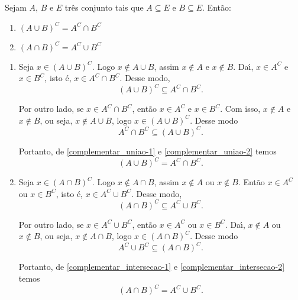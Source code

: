\begin{proposicao} Sejam $A$, $B$ e $E$ tr{\^e}s conjunto tais que $A\subseteq E$ e $B\subseteq E$. Ent{\~a}o:
\begin{enumerate}
	\item $(A\cup B)^C = A^C\cap B^C$
	\item $(A\cap B)^C = A^C\cup B^C$
\end{enumerate}
\end{proposicao}
\begin{prova}
	\begin{enumerate}
		\item Seja $x \in (A\cup B)^C$. Logo $x\notin A\cup B$, assim $x\notin A$ e $x\notin B$. Da{\'\i}, $x\in A^C$ e $x\in B^C$, isto {\'e}, $x\in A^C\cap B^C$. Desse modo,
		\begin{equation}\label{complementar_uniao-1}
			(A\cup B)^C \subseteq A^C\cap B^C.
		\end{equation}

		Por outro lado, se $x\in A^C\cap B^C$, ent{\~a}o $x\in A^C$ e $x\in B^C$. Com isso, $x\notin A$ e $x\notin B$, ou seja, $x\notin A\cup B$, logo $x\in (A\cup B)^C$. Desse modo
		\begin{equation}\label{complementar_uniao-2}
			A^C\cap B^C\subseteq(A\cup B)^C.
		\end{equation}

		Portanto, de \eqref{complementar_uniao-1} e \eqref{complementar_uniao-2} temos
		\[
			(A\cup B)^C = A^C\cap B^C.
		\]

		\item Seja $x \in (A\cap B)^C$. Logo $x\notin A\cap B$, assim $x\notin A$ ou $x\notin B$. Ent\~ao $x\in A^C$ ou $x\in B^C$, isto {\'e}, $x\in A^C\cup B^C$. Desse modo,
		\begin{equation}\label{complementar_intersecao-1}
			(A\cap B)^C \subseteq A^C\cup B^C.
		\end{equation}

		Por outro lado, se $x\in A^C\cup B^C$, ent{\~a}o $x\in A^C$ ou $x\in B^C$. Da{\'\i}, $x\notin A$ ou $x\notin B$, ou seja, $x\notin A\cap B$, logo $x\in (A\cap B)^C$. Desse modo
		\begin{equation}\label{complementar_intersecao-2}
			A^C\cup B^C\subseteq(A\cap B)^C.
		\end{equation}

		Portanto, de \eqref{complementar_intersecao-1} e \eqref{complementar_intersecao-2} temos
		\[
			(A\cap B)^C = A^C\cup B^C.
		\]
	\end{enumerate}
\end{prova}

